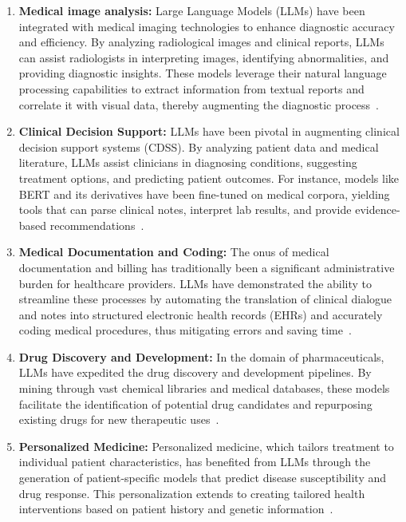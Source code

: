 \begin{enumerate}
	\item \textbf{Medical image analysis:}{
		      Large Language Models (LLMs) have been integrated with medical imaging technologies to enhance diagnostic accuracy and efficiency.
		      By analyzing radiological images and clinical reports, LLMs can assist radiologists in interpreting images, identifying abnormalities, and providing diagnostic insights.
		      These models leverage their natural language processing capabilities to extract information from textual reports and correlate it with visual data, thereby augmenting the diagnostic process~\cite{li2021survey, zhang2021medical}.
	      }

	\item \textbf{Clinical Decision Support:}{
		      LLMs have been pivotal in augmenting clinical decision support systems (CDSS). By analyzing patient data and medical literature, LLMs assist clinicians in diagnosing conditions, suggesting treatment options, and predicting patient outcomes. For instance, models like BERT and its derivatives have been fine-tuned on medical corpora, yielding tools that can parse clinical notes, interpret lab results, and provide evidence-based recommendations~\cite{alsentzer2019publicly}.
	      }

	\item \textbf{Medical Documentation and Coding:}{
		      The onus of medical documentation and billing has traditionally been a significant administrative burden for healthcare providers. LLMs have demonstrated the ability to streamline these processes by automating the translation of clinical dialogue and notes into structured electronic health records (EHRs) and accurately coding medical procedures, thus mitigating errors and saving time~\cite{shickel2018deep}.
	      }

	\item \textbf{Drug Discovery and Development:}{
		      In the domain of pharmaceuticals, LLMs have expedited the drug discovery and development pipelines. By mining through vast chemical libraries and medical databases, these models facilitate the identification of potential drug candidates and repurposing existing drugs for new therapeutic uses~\cite{zhavoronkov2019deep}.
	      }

	\item \textbf{Personalized Medicine:}{
		      Personalized medicine, which tailors treatment to individual patient characteristics, has benefited from LLMs through the generation of patient-specific models that predict disease susceptibility and drug response. This personalization extends to creating tailored health interventions based on patient history and genetic information~\cite{hamburg2010path}.
	      }


\end{enumerate}
